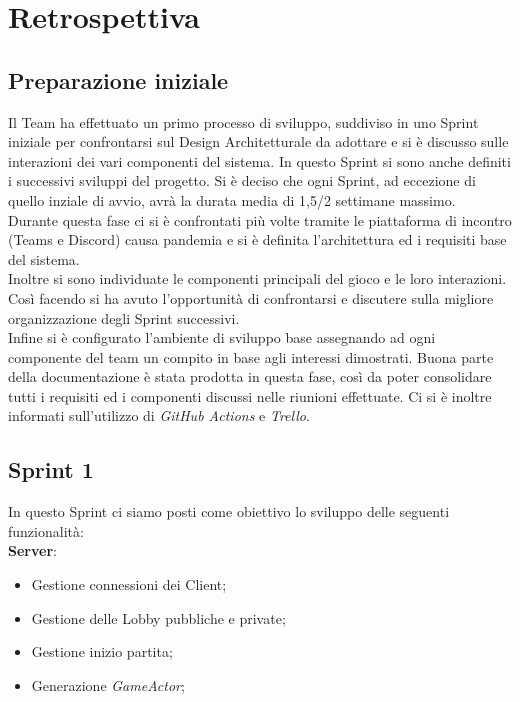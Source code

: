 \chapter{Retrospettiva}

\section{Preparazione iniziale}

Il Team ha effettuato un primo processo di sviluppo, suddiviso in uno Sprint iniziale per confrontarsi sul Design Architetturale da adottare e si \`e discusso sulle interazioni dei vari componenti del sistema. In questo Sprint si sono anche definiti i successivi sviluppi del progetto. Si \`e deciso che ogni Sprint, ad eccezione di quello inziale di avvio, avr\`a la durata media di 1,5/2 settimane massimo.\\
Durante questa fase ci si \`e confrontati pi\`u volte tramite le piattaforma di incontro (Teams e Discord) causa pandemia e si \`e definita l'architettura ed i requisiti base del sistema.\\
Inoltre si sono individuate le componenti principali del gioco e le loro interazioni. Cos\`i facendo si ha avuto l'opportunit\`a di confrontarsi e discutere sulla migliore organizzazione degli Sprint successivi.\\
Infine si \`e configurato l'ambiente di sviluppo base assegnando ad ogni componente del team un compito in base agli interessi dimostrati. Buona parte della documentazione \`e stata prodotta in questa fase, cos\`i da poter consolidare tutti i requisiti ed i componenti discussi nelle riunioni effettuate. Ci si \`e inoltre informati sull'utilizzo di \textit{GitHub Actions} e \textit{Trello}.

\section{Sprint 1}
In questo Sprint ci siamo posti come obiettivo lo sviluppo delle seguenti funzionalit\`a:\\

\textbf{Server}:
\begin{itemize}
    \item Gestione connessioni dei Client; 
    \item Gestione delle Lobby pubbliche e private;
    \item Gestione inizio partita;
    \item Generazione \textit{GameActor};
\end{itemize}

